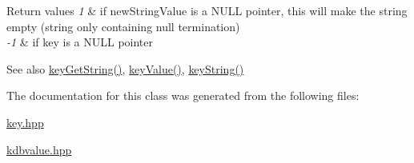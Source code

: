 \begin{DoxyRetVals}{Return values}
{\em 1} & if new\+String\+Value is a N\+U\+LL pointer, this will make the string empty (string only containing null termination) \\
\hline
{\em -\/1} & if key is a N\+U\+LL pointer \\
\hline
\end{DoxyRetVals}
\begin{DoxySeeAlso}{See also}
\hyperlink{group__keyvalue_ga41b9fac5ccddafe407fc0ae1e2eb8778}{key\+Get\+String()}, \hyperlink{group__keyvalue_ga6f29609c5da53c6dc26a98678d5752af}{key\+Value()}, \hyperlink{group__keyvalue_ga880936f2481d28e6e2acbe7486a21d05}{key\+String()} 
\end{DoxySeeAlso}


The documentation for this class was generated from the following files\+:\begin{DoxyCompactItemize}
\item 
\hyperlink{key_8hpp}{key.\+hpp}\item 
\hyperlink{kdbvalue_8hpp}{kdbvalue.\+hpp}\end{DoxyCompactItemize}
